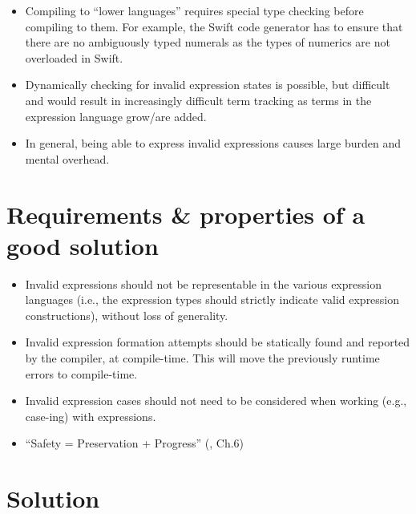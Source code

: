 \begin{itemize}

      \item Compiling to ``lower languages'' requires special type checking
            before compiling to them. For example, the Swift code generator has
            to ensure that there are no ambiguously typed numerals as the types
            of numerics are not overloaded in Swift.

      \item Dynamically checking for invalid expression states is possible, but
            difficult and would result in increasingly difficult term tracking
            as terms in the expression language grow/are added.

      \item In general, being able to express invalid expressions causes large
            burden and mental overhead.

\end{itemize}


\section{Requirements \& properties of a good solution}

\begin{itemize}

      \item Invalid expressions should not be representable in the various
            expression languages (i.e., the expression types should strictly
            indicate valid expression constructions), without loss of
            generality.

      \item Invalid expression formation attempts should be statically found and
            reported by the compiler, at compile-time. This will move the
            previously runtime errors to compile-time.

      \item Invalid expression cases should not need to be considered when
            working (e.g., case-ing) with expressions.

      \item ``Safety = Preservation + Progress'' (\cite{Harper2016}, Ch.6)

\end{itemize}

\section{Solution}

